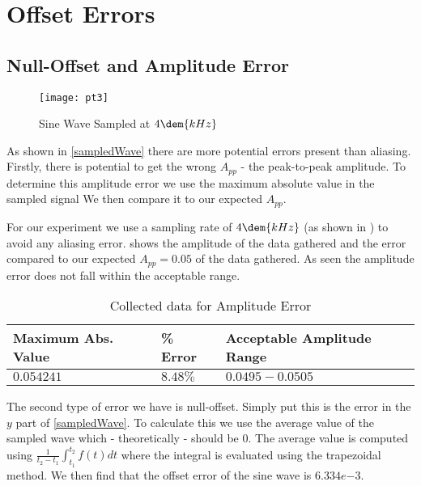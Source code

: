 \documentclass[main.tex]{subfile}
\begin{document}
\section{Offset Errors} 
\label{sec:nyquist_frequency}

\subsection{Null-Offset and Amplitude Error}
\label{sec:amplitude_error}

\begin{figure}[H]
	\begin{center}
		\texttt{[image: pt3]}
	\end{center}
	\caption{Sine Wave Sampled at $4\dem{kHz}$}
	\label{fig:4korig}
\end{figure}

As shown in \eqref{sampledWave} there are more potential errors present than
aliasing. Firstly, there is potential to get the wrong $A_{pp}$ - the
peak-to-peak amplitude. To determine this amplitude error we use the maximum
absolute value in the sampled signal We then compare it to our expected
$A_{pp}$. 

For our experiment we use a sampling rate of $4\dem{kHz}$ (as shown in
) to avoid any aliasing error.  shows the
amplitude of the data gathered and the error compared to our expected $A_{pp} =
0.05$ of the data gathered. As seen the amplitude error does not fall within the
acceptable range.

\begin{table}[H]
  \begin{center}
    \caption{Collected data for Amplitude Error}
    \label{tab:ampError}
    \begin{tabular}{lll}
      \\ \toprule
      Maximum Abs. Value & \% Error  & Acceptable Amplitude Range
      \\ \midrule
      $0.054241$ & $8.48\%$ & $0.0495 - 0.0505$
      \\ \bottomrule
    \end{tabular}
  \end{center}
\end{table}

The second type of error we have is null-offset. Simply put this is the error in
the $y$ part of \eqref{sampledWave}. To calculate this we use the average value
of the sampled wave which - theoretically - should be $0$. The average value is
computed using $\frac{1}{t_2-t_1}\int_{t_1}^{t_2}{f(t) dt}$ where the integral
is evaluated using the trapezoidal method. We then find that the offset error of
the sine wave is $6.334e{-3}$.
\end{document}

